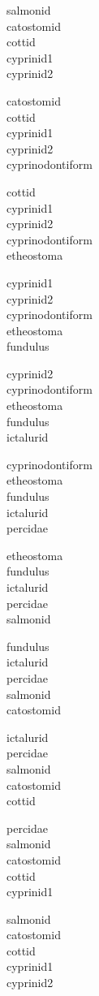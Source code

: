 \documentclass[11pt]{article}
\begin{document}
\begin{multicols*}{3}
salmonid\\
catostomid \\
cottid \\
cyprinid1 \\
cyprinid2 \bigskip

catostomid \\
cottid \\
cyprinid1 \\
cyprinid2 \\
cyprinodontiform \bigskip

cottid \\
cyprinid1 \\
cyprinid2 \\
cyprinodontiform \\
etheostoma \bigskip

cyprinid1 \\
cyprinid2 \\
cyprinodontiform \\
etheostoma \\
fundulus \bigskip

cyprinid2 \\
cyprinodontiform \\
etheostoma \\
fundulus \\
ictalurid

\columnbreak

cyprinodontiform \\
etheostoma \\
fundulus \\
ictalurid \\
percidae  \bigskip

etheostoma \\
fundulus \\
ictalurid \\
percidae \\
salmonid \bigskip

fundulus \\
ictalurid \\
percidae \\
salmonid \\
catostomid \bigskip

ictalurid \\
percidae \\
salmonid\\
catostomid \\
cottid \bigskip

percidae \\
salmonid\\
catostomid \\
cottid \\
cyprinid1 \bigskip

salmonid\\
catostomid \\
cottid \\
cyprinid1 \\
cyprinid2
\end{multicols*}
\end{document}
